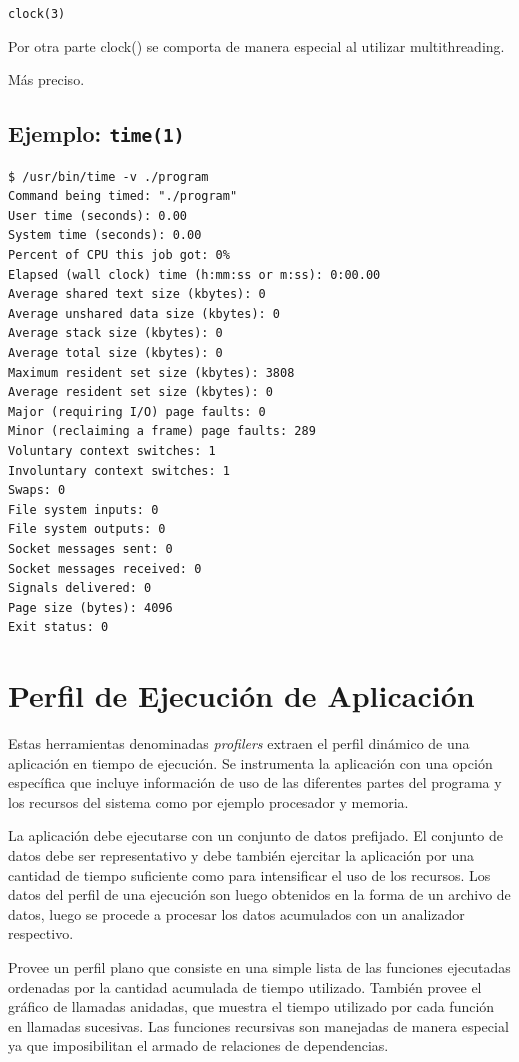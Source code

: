 \documentclass[a4paper]{report}
\begin{document}
{\tt clock(3)}

Por otra parte clock() se comporta de manera especial al utilizar multithreading.

Más preciso.

\subsection{Ejemplo: {\tt time(1)}}

\begin{lstlisting} 
$ /usr/bin/time -v ./program
Command being timed: "./program"
User time (seconds): 0.00
System time (seconds): 0.00
Percent of CPU this job got: 0%
Elapsed (wall clock) time (h:mm:ss or m:ss): 0:00.00
Average shared text size (kbytes): 0
Average unshared data size (kbytes): 0
Average stack size (kbytes): 0
Average total size (kbytes): 0
Maximum resident set size (kbytes): 3808
Average resident set size (kbytes): 0
Major (requiring I/O) page faults: 0
Minor (reclaiming a frame) page faults: 289
Voluntary context switches: 1
Involuntary context switches: 1
Swaps: 0
File system inputs: 0
File system outputs: 0
Socket messages sent: 0
Socket messages received: 0
Signals delivered: 0
Page size (bytes): 4096
Exit status: 0
\end{lstlisting}

\section{Perfil de Ejecución de Aplicación}

Estas herramientas denominadas {\it profilers} extraen el perfil dinámico de una aplicación en tiempo de ejecución. 
Se instrumenta la aplicación con una opción específica que incluye información de uso de las diferentes partes del programa y los recursos del sistema como por ejemplo procesador y memoria.

\bigskip

La aplicación debe ejecutarse con un conjunto de datos prefijado. El conjunto de
datos debe ser representativo y debe también ejercitar la aplicación por
una cantidad de tiempo suficiente como para intensificar el uso de los
recursos. Los datos del perfil de una ejecución son luego obtenidos en la
forma de un archivo de datos, luego se procede a procesar los datos acumulados
con un analizador respectivo.

\bigskip

Provee un perfil plano que consiste en una simple lista de las funciones
ejecutadas ordenadas por la cantidad acumulada de tiempo utilizado.
También provee el gráfico de llamadas anidadas, que muestra el tiempo
utilizado por cada función en llamadas sucesivas. Las funciones recursivas
son manejadas de manera especial ya que imposibilitan el armado de relaciones
de dependencias.
\end{document}

